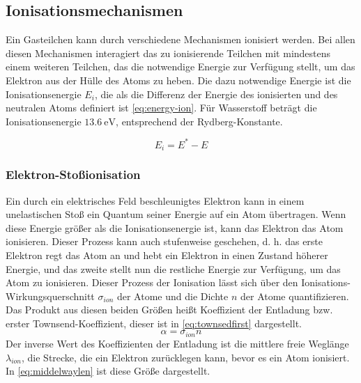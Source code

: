 \subsection{Ionisationsmechanismen}
Ein Gasteilchen kann durch verschiedene Mechanismen ionisiert werden. Bei allen diesen Mechanismen interagiert das zu ionisierende Teilchen mit mindestens einem weiteren Teilchen, das die notwendige Energie zur Verfügung stellt, um das Elektron aus der Hülle des Atoms zu heben. Die dazu notwendige Energie ist die Ionisationsenergie \(E_i\), die als die Differenz der Energie des ionisierten und des neutralen Atoms definiert ist \eqref{eq:energy-ion}. Für Wasserstoff beträgt die Ionisationsenergie \(\SI{13,6}{\electronvolt}\), entsprechend der Rydberg-Konstante.

\begin{equation}
    E_{i} = E^{*} - E
    \label{eq:energy-ion}
\end{equation}

\subsubsection{Elektron-Stoßionisation}
Ein durch ein elektrisches Feld beschleunigtes Elektron kann in einem unelastischen Stoß ein Quantum seiner Energie auf ein Atom übertragen. Wenn diese Energie größer als die Ionisationsenergie ist, kann das Elektron das Atom ionisieren. Dieser Prozess kann auch stufenweise geschehen, d. h. das erste Elektron regt das Atom an und hebt ein Elektron in einen Zustand höherer Energie, und das zweite stellt nun die restliche Energie zur Verfügung, um das Atom zu ionisieren. Dieser Prozess der Ionisation lässt sich über den Ionisations-Wirkungsquerschnitt \(\sigma_{ion}\) der Atome und die Dichte \(n\) der Atome quantifizieren. Das Produkt aus diesen beiden Größen heißt Koeffizient der Entladung bzw. erster Townsend-Koeffizient, dieser ist in \eqref{eq:townsedfirst} dargestellt.
\begin{equation}
    \alpha = \sigma_{ion} n
    \label{eq:townsedfirst}
\end{equation}
Der inverse Wert des Koeffizienten der Entladung ist die mittlere freie Weglänge \(\lambda_{ion}\), die Strecke, die ein Elektron zurücklegen kann, bevor es ein Atom ionisiert. In \eqref{eq:middelwaylen} ist diese Größe dargestellt.


